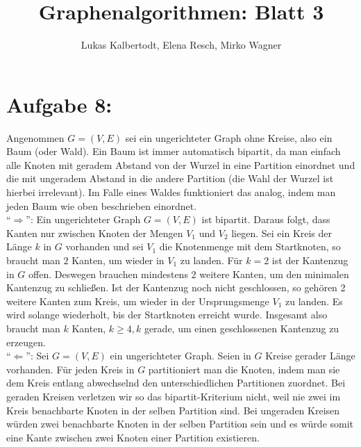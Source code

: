 \documentclass[11pt]{scrartcl} %
\title{Graphenalgorithmen: Blatt 3}
\author{Lukas Kalbertodt, Elena Resch, Mirko Wagner}
\begin{document}
\maketitle
\section*{Aufgabe 8:}
\begin{compactenum}[(a)]
\item Angenommen $G = (V, E)$ sei ein ungerichteter Graph ohne Kreise, also ein Baum (oder Wald). Ein Baum ist immer automatisch bipartit, da man einfach alle Knoten mit geradem Abstand von der Wurzel in eine Partition einordnet und die mit ungeradem Abstand in die andere Partition (die Wahl der Wurzel ist hierbei irrelevant). Im Falle eines Waldes funktioniert das analog, indem man jeden Baum wie oben beschrieben einordnet.\\
\enquote{$\Rightarrow$}: Ein ungerichteter Graph $G =(V,E)$ ist bipartit. Daraus folgt, dass Kanten nur zwischen Knoten der Mengen $V_1$ und $V_2$ liegen. Sei ein Kreis der Länge $k$ in $G$ vorhanden und sei $V_1$ die Knotenmenge mit dem Startknoten, so braucht man $2$ Kanten, um wieder in $V_1$ zu landen. Für $k=2$ ist der Kantenzug in $G$ offen. Deswegen brauchen mindestens 2 weitere Kanten, um den minimalen Kantenzug zu schließen. Ist der Kantenzug noch nicht geschlossen, so gehören 2 weitere Kanten zum Kreis, um wieder in der Ursprungsmenge $V_1$ zu landen. Es wird solange wiederholt, bis der Startknoten erreicht wurde.
Insgesamt also braucht man $k$ Kanten, $k \geq 4, k$ gerade, um einen geschlossenen Kantenzug zu erzeugen.\\
\enquote{$\Leftarrow$}: Sei $G=(V,E)$ ein ungerichteter Graph. Seien in $G$ Kreise gerader Länge vorhanden. Für jeden Kreis in $G$ partitioniert man die Knoten, indem man sie dem Kreis entlang abwechselnd den unterschiedlichen Partitionen zuordnet. Bei geraden Kreisen verletzen wir so das bipartit-Kriterium nicht, weil nie zwei im Kreis benachbarte Knoten in der selben Partition sind. Bei ungeraden Kreisen würden zwei benachbarte Knoten in der selben Partition sein und es würde somit eine Kante zwischen zwei Knoten einer Partition existieren.\\


\end{compactenum}
\end{document}
